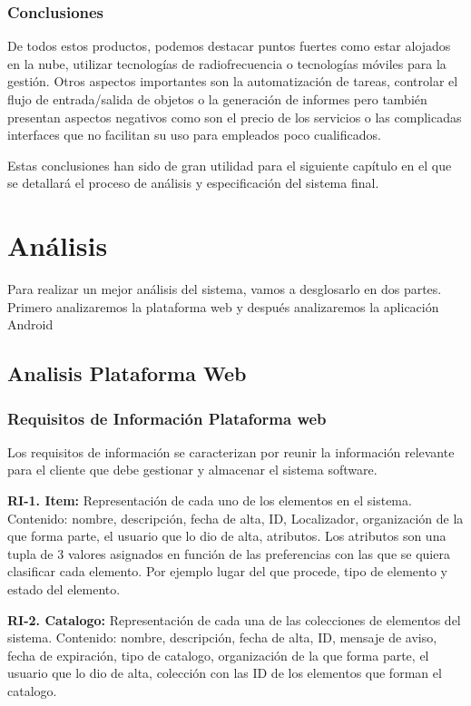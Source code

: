 \documentclass[a4paper,11pt]{book}
\begin{document}
\subsection{Conclusiones}

De todos estos productos, podemos destacar puntos fuertes como estar alojados en la nube, utilizar tecnologías de radiofrecuencia o tecnologías móviles para la gestión. Otros aspectos importantes son la automatización de tareas, controlar el flujo de entrada/salida de objetos o la generación de informes pero también presentan aspectos negativos como son el precio de los servicios o las complicadas interfaces que no facilitan su uso para empleados poco cualificados. 

Estas conclusiones  han sido de gran utilidad para el siguiente capítulo en el que se detallará el proceso de análisis y especificación del sistema final.  

\chapter{Análisis}



Para realizar un mejor análisis del sistema, vamos a desglosarlo en dos partes. Primero analizaremos la plataforma web y después analizaremos la aplicación Android 

\section{Analisis Plataforma Web}
\subsection{Requisitos de Información Plataforma web}

Los requisitos de información se caracterizan por  reunir la información 	relevante para el cliente que debe gestionar y almacenar el sistema software.\par 

\textbf{RI-1. Item:} Representación de cada uno de los elementos en el sistema. 
Contenido: nombre, descripción, fecha de alta, ID, Localizador, organización de la que forma parte, el usuario que lo dio de alta, atributos. Los atributos son una tupla de 3 valores asignados en función de las preferencias con las que se quiera clasificar  cada elemento. Por ejemplo lugar del que procede, tipo de elemento y estado del elemento.


\textbf{RI-2. Catalogo:} Representación de cada una de las colecciones de elementos del sistema. Contenido: nombre, descripción, fecha de alta, ID, mensaje de aviso, fecha de expiración, tipo de catalogo,  organización de la que forma parte, el usuario que lo dio de alta, colección con las ID de los elementos que forman el catalogo.
\end{document}
